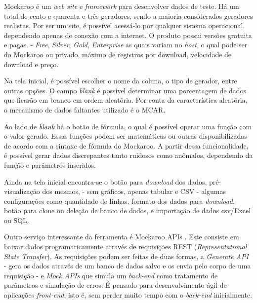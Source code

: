 \documentclass[
	12pt,				%
	openright,			%
	oneside,			%
	a4paper,			%
	english,			%
	brazil				%
	]{abntex2}
\begin{document}
		Mockaroo \cite{mockaroo} é um \emph{web site} e \emph{framework} para desenvolver dados de teste.
		Há um total de cento e quarenta e três geradores, sendo a maioria considerados geradores realistas.
		Por ser um site, é possível acessá-lo por qualquer sistema operacional, dependendo apenas de conexão com a internet.
		O produto possui versões gratuita e pagas. - \emph{Free}, \emph{Silver}, \emph{Gold}, \emph{Enterprise} as quais variam no \emph{host}, o qual pode ser do Mockaroo ou privado, máximo de registros por download, velocidade de download e preço.
		\par
		Na tela inicial, é possível escolher o nome da coluna, o tipo de gerador, entre outras opções.
		O campo \emph{blank} é possível determinar uma porcentagem de dados que ficarão em branco em ordem aleatória.
		Por conta da característica aleatória, o mecanismo de dados faltantes utilizado é o MCAR.
		\par
		Ao lado de \emph{blank} há o botão de fórmula, o qual é possível operar uma função com o valor gerado.
		Essas funções podem ser matemáticas ou outras disponibilizadas de acordo com a sintaxe de fórmula do Mockaroo.
		A partir dessa funcionalidade, é possível gerar dados discrepantes tanto ruidosos como anômalos, dependendo da função e parâmetros inseridos.
		\par
		Ainda na tela inicial encontra-se 
		 o botão para \emph{download} dos dados, 
		 pré-visualização dos mesmos, - sem gráficos, apenas tabular e CSV - 
		 algumas configurações como quantidade de linhas, 
		 formato dos dados para \emph{download}, 
		 botão para clone ou deleção de banco de dados, 
		 e importação de dados csv/Excel ou SQL.
		\par
		Outro serviço interessante da ferramenta é Mockaroo APIs \cite{mockarooAPI}.
		Este consiste em baixar dados programaticamente através de requisições REST (\emph{Representational State Transfer}).
		As requisições podem ser feitas de duas formas, a \emph{Generate API} - gera os dados através de um banco de dados salvo e os envia pelo corpo de uma requisição - 
		e \emph{Mock APIs} que simula um \emph{back-end} como tratamento de parâmetros e simulação de erros. 
		É pensado para desenvolvimento ágil de aplicações \emph{front-end}, isto é, sem perder muito tempo com o \emph{back-end} inicialmente.
\end{document}
